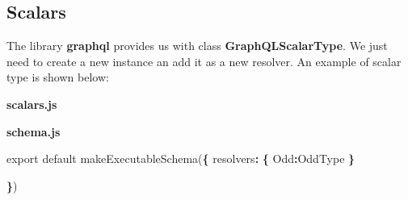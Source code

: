 \documentclass[]{book}
\newenvironment{Shaded}{\begin{snugshade}}{\end{snugshade}}
\newcommand{\KeywordTok}[1]{\textcolor[rgb]{0.13,0.29,0.53}{\textbf{#1}}}
\newcommand{\DataTypeTok}[1]{\textcolor[rgb]{0.13,0.29,0.53}{#1}}
\newcommand{\DecValTok}[1]{\textcolor[rgb]{0.00,0.00,0.81}{#1}}
\newcommand{\StringTok}[1]{\textcolor[rgb]{0.31,0.60,0.02}{#1}}
\newcommand{\ImportTok}[1]{#1}
\newcommand{\VariableTok}[1]{\textcolor[rgb]{0.00,0.00,0.00}{#1}}
\newcommand{\ControlFlowTok}[1]{\textcolor[rgb]{0.13,0.29,0.53}{\textbf{#1}}}
\newcommand{\OperatorTok}[1]{\textcolor[rgb]{0.81,0.36,0.00}{\textbf{#1}}}
\newcommand{\AttributeTok}[1]{\textcolor[rgb]{0.77,0.63,0.00}{#1}}
\newcommand{\NormalTok}[1]{#1}
\begin{document}
\subsection{Scalars}\label{scalars}

The library \textbf{graphql} provides us with class
\textbf{GraphQLScalarType}. We just need to create a new instance an add
it as a new resolver. An example of scalar type is shown below:

\textbf{scalars.js}

\begin{Shaded}
\end{Shaded}

\textbf{schema.js}

\begin{Shaded}
\begin{Highlighting}[]
\ImportTok{export} \ImportTok{default} \AttributeTok{makeExecutableSchema}\NormalTok{(}\OperatorTok{\{}
    \DataTypeTok{resolvers}\OperatorTok{:} \OperatorTok{\{}
        \DataTypeTok{Odd}\OperatorTok{:}\NormalTok{OddType}
    \OperatorTok{\}}

\OperatorTok{\}}\NormalTok{)}
\end{Highlighting}
\end{Shaded}
\end{document}
